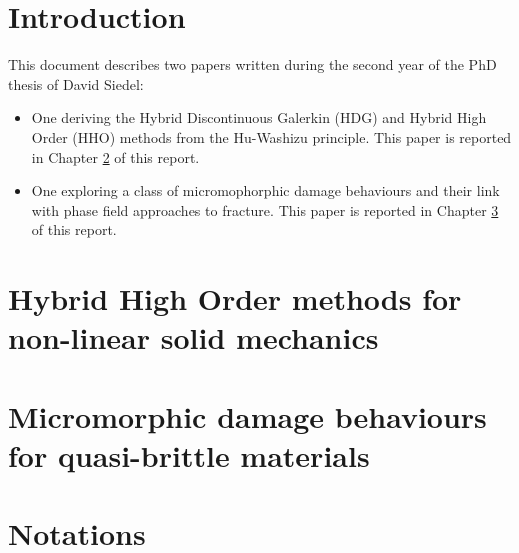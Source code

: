 \documentclass[anti,rapport,anglais]{note_technique_2018}
\affiliation{(*) DES/ISAS/DM2S/SEMT/LM2S}
\begin{document}
\chapter{Introduction}

This document describes two papers written during the second year of
the PhD thesis of David Siedel:
\begin{itemize}
  \item One deriving the Hybrid Discontinuous Galerkin (HDG) and
  Hybrid High Order (HHO) methods from the Hu-Washizu principle. This
  paper is reported in Chapter \ref{chapter:hho} of this report.
  \item One exploring a class of micromophorphic damage
  behaviours and their link with phase field approaches to fracture.
  This paper is reported in Chapter \ref{chapter:micromorphic_damage} of
  this report.
\end{itemize}

\chapter{Hybrid High Order methods for non-linear solid mechanics}
\label{chapter:hho}








\chapter{Micromorphic damage behaviours for quasi-brittle materials}
\label{chapter:micromorphic_damage}








\appendix

\chapter{Notations}

\end{document}
